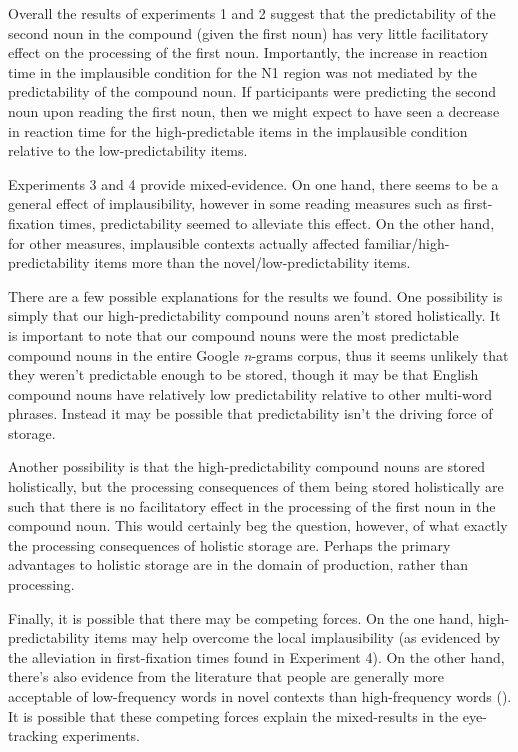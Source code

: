 \documentclass[
  12pt,
  letterpaper,
]{scrreprt}
\begin{document}
Overall the results of experiments 1 and 2 suggest that the
predictability of the second noun in the compound (given the first noun)
has very little facilitatory effect on the processing of the first noun.
Importantly, the increase in reaction time in the implausible condition
for the N1 region was not mediated by the predictability of the compound
noun. If participants were predicting the second noun upon reading the
first noun, then we might expect to have seen a decrease in reaction
time for the high-predictable items in the implausible condition
relative to the low-predictability items.

Experiments 3 and 4 provide mixed-evidence. On one hand, there seems to
be a general effect of implausibility, however in some reading measures
such as first-fixation times, predictability seemed to alleviate this
effect. On the other hand, for other measures, implausible contexts
actually affected familiar/high-predictability items more than the
novel/low-predictability items.

There are a few possible explanations for the results we found. One
possibility is simply that our high-predictability compound nouns aren't
stored holistically. It is important to note that our compound nouns
were the most predictable compound nouns in the entire Google
\emph{n}-grams corpus, thus it seems unlikely that they weren't
predictable enough to be stored, though it may be that English compound
nouns have relatively low predictability relative to other multi-word
phrases. Instead it may be possible that predictability isn't the
driving force of storage.

Another possibility is that the high-predictability compound nouns are
stored holistically, but the processing consequences of them being
stored holistically are such that there is no facilitatory effect in the
processing of the first noun in the compound noun. This would certainly
beg the question, however, of what exactly the processing consequences
of holistic storage are. Perhaps the primary advantages to holistic
storage are in the domain of production, rather than processing.

Finally, it is possible that there may be competing forces. On the one
hand, high-predictability items may help overcome the local
implausibility (as evidenced by the alleviation in first-fixation times
found in Experiment 4). On the other hand, there's also evidence from
the literature that people are generally more acceptable of
low-frequency words in novel contexts than high-frequency words
().
It is possible that these competing forces explain the mixed-results in
the eye-tracking experiments.
\end{document}
